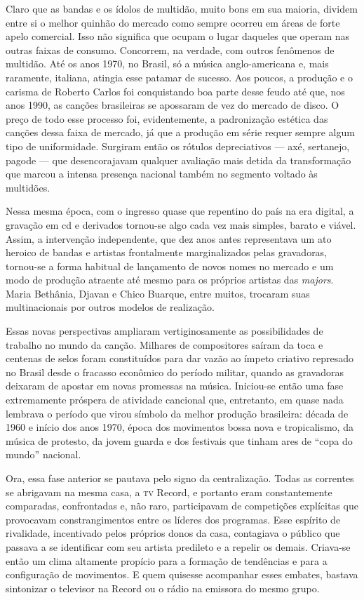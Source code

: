 Claro que as bandas e os ídolos de multidão, muito bons em sua maioria,
dividem entre si o melhor quinhão do mercado como sempre ocorreu em
áreas de forte apelo comercial. Isso não significa que ocupam o lugar
daqueles que operam nas outras faixas de consumo. Concorrem, na verdade,
com outros fenômenos de multidão. Até os anos 1970, no Brasil, só a
música anglo-americana e, mais raramente, italiana, atingia esse
patamar de sucesso. Aos poucos, a produção e o carisma de Roberto Carlos
foi conquistando boa parte desse feudo até que, nos anos 1990, as
canções brasileiras se apossaram de vez do mercado de disco. O preço de
todo esse processo foi, evidentemente, a padronização estética das
canções dessa faixa de mercado, já que a produção em série requer sempre
algum tipo de uniformidade. Surgiram então os rótulos depreciativos ---
axé, sertanejo, pagode --- que desencorajavam qualquer avaliação mais
detida da transformação que marcou a intensa presença nacional também no
segmento voltado às multidões.

Nessa mesma época, com o ingresso quase que repentino do país na era
digital, a gravação em cd e derivados tornou-se algo cada vez mais
simples, barato e viável. Assim, a intervenção independente, que dez
anos antes representava um ato heroico de bandas e artistas frontalmente
marginalizados pelas gravadoras, tornou-se a forma habitual de
lançamento de novos nomes no mercado e um modo de produção atraente até
mesmo para os próprios artistas das \emph{majors}. Maria Bethânia,
Djavan e Chico Buarque, entre muitos, trocaram suas multinacionais por
outros modelos de realização.

Essas novas perspectivas ampliaram vertiginosamente as possibilidades de
trabalho no mundo da canção. Milhares de compositores saíram da toca e
centenas de selos foram constituídos para dar vazão ao ímpeto criativo
represado no Brasil desde o fracasso econômico do período militar,
quando as gravadoras deixaram de apostar em novas promessas na música.
Iniciou-se então uma fase extremamente próspera de atividade cancional
que, entretanto, em quase nada lembrava o período que virou símbolo da
melhor produção brasileira: década de 1960 e início dos anos 1970, época
dos movimentos bossa nova e tropicalismo, da música de protesto, da
jovem guarda e dos festivais que tinham ares de ``copa do mundo''
nacional.

Ora, essa fase anterior se pautava pelo signo da centralização. Todas as
correntes se abrigavam na mesma casa, a \textsc{tv} Record, e portanto eram
constantemente comparadas, confrontadas e, não raro, participavam de
competições explícitas que provocavam constrangimentos entre os líderes
dos programas. Esse espírito de rivalidade, incentivado pelos próprios
donos da casa, contagiava o público que passava a se identificar com seu
artista predileto e a repelir os demais. Criava-se então um clima
altamente propício para a formação de tendências e para a configuração
de movimentos. E quem quisesse acompanhar esses embates, bastava
sintonizar o televisor na Record ou o rádio na emissora do mesmo grupo.

